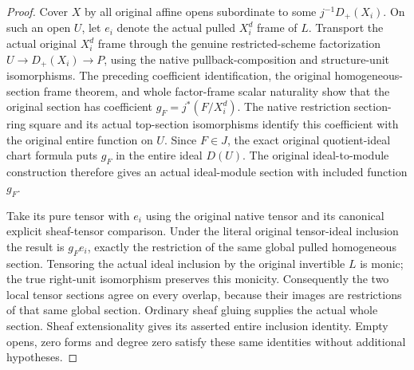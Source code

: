 \begin{proof}
Cover $X$ by all original affine opens subordinate to some
$j^{-1}D_+(X_i)$.  On such an open $U$, let $e_i$ denote the actual pulled
$X_i^d$ frame of $L$.  Transport the actual original $X_i^d$ frame through the genuine
restricted-scheme factorization $U\to D_+(X_i)\to P$, using the native
pullback-composition and structure-unit isomorphisms.  The preceding
coefficient identification, the original homogeneous-section frame
theorem, and whole factor-frame scalar naturality show that the original
section has coefficient $g_F=j^*(F/X_i^d)$.  The native restriction
section-ring square and its actual top-section isomorphisms identify
this coefficient with the original entire function on $U$.  Since $F\in J$, the exact
original quotient-ideal chart formula puts $g_F$ in the entire ideal
$D(U)$.  The original ideal-to-module construction therefore gives an
actual ideal-module section with included function $g_F$.

Take its pure tensor with $e_i$ using the original native tensor and
its canonical explicit sheaf-tensor comparison.  Under the literal
original tensor-ideal inclusion the result is $g_Fe_i$, exactly the
restriction of the same global pulled homogeneous section.  Tensoring
the actual ideal inclusion by the original invertible $L$ is monic;
the true right-unit isomorphism preserves this monicity.  Consequently
the two local tensor sections agree on every overlap, because their
images are restrictions of that same global section.  Ordinary sheaf
gluing supplies the actual whole section.  Sheaf extensionality gives
its asserted entire inclusion identity.   Empty opens, zero forms and degree zero satisfy these
same identities without additional hypotheses.
\end{proof}

